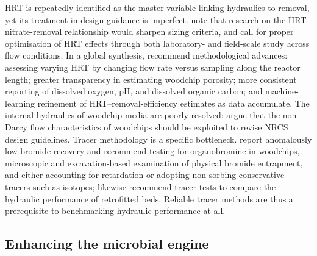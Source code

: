 \documentclass[11pt]{article}
\begin{document}
HRT is repeatedly identified as the master variable linking hydraulics to
removal, yet its treatment in design guidance is imperfect. \textcite{Moorman2015}
note that research on the HRT--nitrate-removal relationship would sharpen sizing
criteria, and \textcite{Povilaitis2018} call for proper optimisation of HRT
effects through both laboratory- and field-scale study across flow conditions. In
a global synthesis, \textcite{Christianson2025c} recommend methodological
advances: assessing varying HRT by changing flow rate versus sampling along the
reactor length; greater transparency in estimating woodchip porosity; more
consistent reporting of dissolved oxygen, pH, and dissolved organic carbon; and
machine-learning refinement of HRT--removal-efficiency estimates as data
accumulate. The internal hydraulics of woodchip media are poorly resolved:
\textcite{Ghane2016} argue that the non-Darcy flow characteristics of woodchips
should be exploited to revise NRCS design guidelines. Tracer methodology is a
specific bottleneck. \textcite{Ghane2019b} report anomalously low bromide
recovery and recommend testing for organobromine in woodchips, microscopic and
excavation-based examination of physical bromide entrapment, and either
accounting for retardation or adopting non-sorbing conservative tracers such as
isotopes; \textcite{Ghane2018} likewise recommend tracer tests to compare the
hydraulic performance of retrofitted beds. Reliable tracer methods are thus a
prerequisite to benchmarking hydraulic performance at all.

\subsection{Enhancing the microbial engine}
\end{document}
